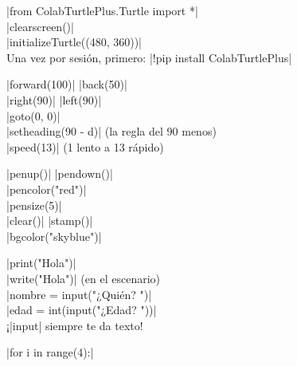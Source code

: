 \begin{tcbraster}[raster columns=2, raster column skip=10pt, raster row skip=8pt, raster equal height=rows,
  raster every box/.style={arc=6pt, coltitle=ink, fontupper=\small, left=6pt, right=4pt, top=3pt, bottom=3pt}]
\begin{tcolorbox}[raster multicolumn=2, colback=white, colframe=pen, colbacktitle=pen!40, title=\textbf{Empieza un dibujo: las tres líneas de inicio}]
\py|from ColabTurtlePlus.Turtle import *|\\
\py|clearscreen()|\\
\py|initializeTurtle((480, 360))|\\[2pt]
{\color{muted}Una vez por sesión, primero: \py|!pip install ColabTurtlePlus|}
\end{tcolorbox}
\begin{tcolorbox}[colback=white, colframe=motion, colbacktitle=motion!40, title=\textbf{Moverse}]
\py|forward(100)| \quad \py|back(50)|\\
\py|right(90)| \quad \py|left(90)|\\
\py|goto(0, 0)|\\
\py|setheading(90 - d)| {\color{muted}(la regla del 90 menos)}\\
\py|speed(13)| {\color{muted}(1 lento a 13 rápido)}
\end{tcolorbox}
\begin{tcolorbox}[colback=white, colframe=pen, colbacktitle=pen!40, title=\textbf{Lápiz}]
\py|penup()| \quad \py|pendown()|\\
\py|pencolor("red")|\\
\py|pensize(5)|\\
\py|clear()| \quad \py|stamp()|\\
\py|bgcolor("skyblue")|
\end{tcolorbox}
\begin{tcolorbox}[colback=white, colframe=looks, colbacktitle=looks!40, title=\textbf{Decir y preguntar}]
\py|print("Hola")|\\
\py|write("Hola")| {\color{muted}(en el escenario)}\\
\py|nombre = input("¿Quién? ")|\\
\py|edad = int(input("¿Edad? "))|\\
{\color{muted}¡\py|input| siempre te da texto!}
\end{tcolorbox}
\begin{tcolorbox}[colback=white, colframe=control, colbacktitle=control!40, title=\textbf{Bucles}]
\py|for i in range(4):|\\

\end{tcolorbox}
\end{tcbraster}
